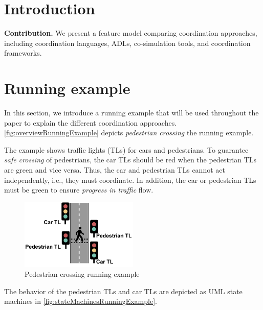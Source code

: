 \documentclass[runningheads]{llncs}
\begin{document}
\section{Introduction} \label{sec:introduction}




\textbf{Contribution.} We present a feature model comparing coordination approaches, including coordination languages, ADLs, co-simulation tools, and coordination frameworks.

\section{Running example}
In this section, we introduce a running example that will be used throughout the paper to explain the different coordination approaches.
\autoref{fig:overviewRunningExample} depicts \textit{pedestrian crossing} the running example.

The example shows traffic lights (TLs) for cars and pedestrians.
To guarantee \textit{safe crossing} of pedestrians, the car TLs should be red when the pedestrian TLs are green and vice versa.
Thus, the car and pedestrian TLs cannot act independently, i.e., they must coordinate.
In addition, the car or pedestrian TLs must be green to ensure \textit{progress in traffic} flow.

\begin{figure}[ht]
	\centering
	\includegraphics[width=0.5\textwidth]{images/running_example_schematic}
	\caption{Pedestrian crossing running example}
	\label{fig:overviewRunningExample}
\end{figure}

The behavior of the pedestrian TLs and car TLs are depicted as UML state machines \cite{objectmanagementgroupUnifiedModelingLanguage2017} in \autoref{fig:stateMachinesRunningExample}.
\end{document}
